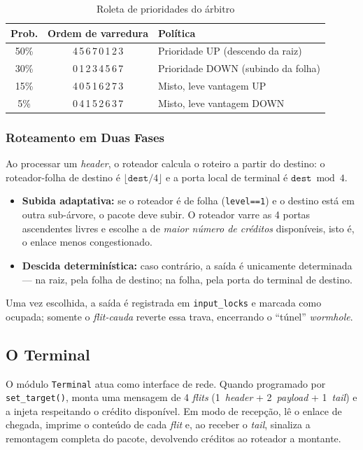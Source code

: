 \documentclass[conference]{IEEEtran}
\begin{document}
\begin{table}[!t]
\caption{Roleta de prioridades do árbitro}
\label{tab:roleta}
\centering
\renewcommand{\arraystretch}{1.2}
\begin{tabular}{@{}ccl@{}}
\toprule
\textbf{Prob.} & \textbf{Ordem de varredura} & \textbf{Política} \\
\midrule
50\% & 4\,5\,6\,7\,0\,1\,2\,3 & Prioridade UP (descendo da raiz) \\
30\% & 0\,1\,2\,3\,4\,5\,6\,7 & Prioridade DOWN (subindo da folha) \\
15\% & 4\,0\,5\,1\,6\,2\,7\,3 & Misto, leve vantagem UP \\
5\%  & 0\,4\,1\,5\,2\,6\,3\,7 & Misto, leve vantagem DOWN \\
\bottomrule
\end{tabular}
\end{table}

\subsubsection{Roteamento em Duas Fases}
Ao processar um \emph{header}, o roteador calcula o roteiro a partir do destino:
o roteador-folha de destino é $\lfloor \texttt{dest}/4 \rfloor$ e a porta local
de terminal é $\texttt{dest} \bmod 4$.
\begin{itemize}
  \item \textbf{Subida adaptativa:} se o roteador é de folha (\texttt{level==1})
  e o destino está em outra sub-árvore, o pacote deve subir. O roteador varre as
  4 portas ascendentes livres e escolhe a de \emph{maior número de créditos}
  disponíveis, isto é, o enlace menos congestionado.
  \item \textbf{Descida determinística:} caso contrário, a saída é unicamente
  determinada --- na raiz, pela folha de destino; na folha, pela porta do
  terminal de destino.
\end{itemize}
Uma vez escolhida, a saída é registrada em \texttt{input\_locks} e marcada como
ocupada; somente o \emph{flit-cauda} reverte essa trava, encerrando o
``túnel'' \emph{wormhole}.

\subsection{O Terminal}
O módulo \texttt{Terminal} atua como interface de rede. Quando programado por
\texttt{set\_target()}, monta uma mensagem de 4 \emph{flits}
(1~\emph{header} + 2~\emph{payload} + 1~\emph{tail}) e a injeta respeitando o
crédito disponível. Em modo de recepção, lê o enlace de chegada, imprime o
conteúdo de cada \emph{flit} e, ao receber o \emph{tail}, sinaliza a remontagem
completa do pacote, devolvendo créditos ao roteador a montante.
\end{document}
